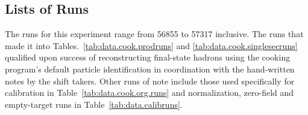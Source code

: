 \subsection{\label{sec:summary.runs}Lists of Runs}

The runs for this experiment range from 56855 to 57317 inclusive. The runs that made it into Tables.~\ref{tab:data.cook.prodruns} and \ref{tab:data.cook.singlesecruns} qualified upon success of reconstructing final-state hadrons using the cooking program's default particle identification in coordination with the hand-written notes by the shift takers. Other runs of note include those used specifically for calibration in Table~\ref{tab:data.cook.org.runs} and normalization, zero-field and empty-target runs in Table~\ref{tab:data.calibruns}.




